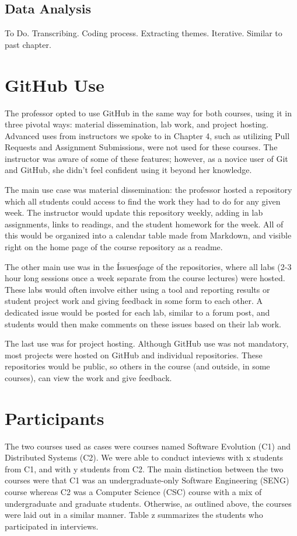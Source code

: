 
\subsection{Data Analysis}
To Do. Transcribing. Coding process. Extracting themes. Iterative. Similar to past chapter.

\section{GitHub Use}
The professor opted to use GitHub in the same way for both courses, using it in three pivotal ways: material dissemination, lab work, and project hosting. Advanced uses from instructors we spoke to in Chapter 4, such as utilizing Pull Requests and Assignment Submissions, were not used for these courses. The instructor was aware of some of these features; however, as a novice user of Git and GitHub, she didn't feel confident using it beyond her knowledge.

The main use case was material dissemination: the professor hosted a repository which all students could access to find the work they had to do for any given week. The instructor would update this repository weekly, adding in lab assignments, links to readings, and the student homework for the week. All of this would be organized into a calendar table made from Markdown, and visible right on the home page of the course repository as a readme.

The other main use was in the \'Issues\' page of the repositories, where all labs (2-3 hour long sessions once a week separate from the course lectures) were hosted. These labs would often involve either using a tool and reporting results or student project work and giving feedback in some form to each other. A dedicated issue would be posted for each lab, similar to a forum post, and students would then make comments on these issues based on their lab work.

The last use was for project hosting. Although GitHub use was not mandatory, most projects were hosted on GitHub and individual repositories. These repositories would be public, so others in the course (and outside, in some courses), can view the work and give feedback. %

\section{Participants}
The two courses used as cases were courses named Software Evolution (C1) and Distributed Systems (C2). We were able to conduct inteviews with x students from C1, and with y students from C2. The main distinction between the two courses were that C1 was an undergraduate-only Software Engineering (SENG) course whereas C2 was a Computer Science (CSC) course with a mix of undergraduate and graduate students. Otherwise, as outlined above, the courses were laid out in a similar manner. Table z summarizes the students who participated in interviews.

